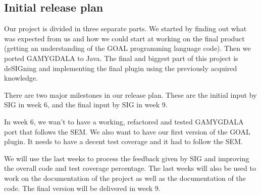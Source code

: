 \subsection{Initial release plan}
Our project is divided in three separate parts. We started by finding out what was expected from us and how we could start at working on the final product (getting an understanding of the \gls{GOAL} programming language code). Then we ported \gls{GAMYGDALA} to Java. The final and biggest part of this project is de\gls{SIG}ning and implementing the final plugin using the previously acquired knowledge. \\ \par
There are two major milestones in our release plan. These are the initial input by \gls{SIG} in week 6, and the final input by \gls{SIG} in week 9. \par 
In week 6, we wan't to have a working, refactored and tested \gls{GAMYGDALA} port that follows the \gls{SEM}. We also want to have our first version of the \gls{GOAL} plugin. It needs to have a decent test coverage and it had to follow the \gls{SEM}. \par
We will use the last weeks to process the feedback given by \gls{SIG} and improving the overall code and test coverage percentage. The last weeks will also be used to work on the documentation of the project as well as the documentation of the code. The final version will be delivered in week 9.